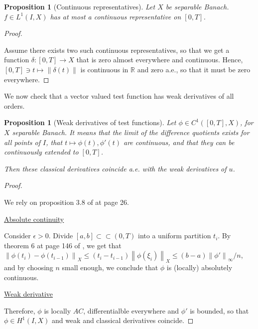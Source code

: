 \documentclass[english,a4paper,12pt,oneside]{scrbook}
\theoremstyle{break}
\newtheorem{prop}[equation]{Proposition}
\newenvironment{mproof}[1][\proofname]{%
  \begin{proof}[#1]$ $\par\nobreak\ignorespaces
}{%
  \end{proof}
}
\renewcommand*{\proofname}{Proof}
\theoremstyle{remark}
\newcommand{\mR}{\mathbb{R}}
\newcommand{\ds}{\displaystyle}
\newcommand{\norm}[1]{\left\lVert#1\right\rVert}
\newcommand{\cc}{\subset\subset}
\newcommand{\emb}{\hookrightarrow}
\begin{document}
\begin{prop}[Continuous representatives]
\label{prop:cts_repr}
Let $X$ be separable Banach. $f \in L^1(I,X)$ has at most a continuous representative on $[0,T]$.
\end{prop}
\begin{mproof}
Assume there exists two such continuous representatives, so that we get a function $\delta: [0,T] \rightarrow X$ that is zero almost everywhere and continuous. Hence, $[0,T] \ni t \mapsto \norm{\delta(t)}$ is continuous in $\mR$ and zero a.e., so that it must be zero everywhere.
\end{mproof}

%
%
%

We now check that a vector valued test function has weak derivatives of all orders.

\begin{prop}[Weak derivatives of test functions]
\label{prop:weak_class}
Let $\phi \in C^1([0,T],X)$, for $X$ separable Banach. It means that the limit of the difference quotients exists for all points of $I$, that $t\mapsto \phi(t), \phi'(t)$ are continuous, and that they can be continuously extended to $[0,T]$.

Then these classical derivatives coincide a.e. with the weak derivatives of $u$.

\end{prop}
\begin{mproof}


We rely on proposition 3.8 of \cite{kreuter} at page 26.

\underline{Absolute continuity}

Consider $\epsilon >0$. Divide $[a,b] \cc (0,T)$ into a uniform partition $t_i$. By theorem 6 at page 146 of \cite{mvt}, we get that $\ds \norm{\phi(t_i)-\phi(t_{i-1})}_X \leq (t_i-t_{i-1})\norm{\phi(\xi_i)}_X\leq (b-a) \norm{\phi'}_{\infty}/n$, and by choosing $n$ small enough, we conclude that $\phi$ is (locally) absolutely continuous.

\underline{Weak derivative}

Therefore, $\phi$ is locally $AC$, differentialble everywhere and $\phi'$ is bounded, so that $\phi \in H^1(I,X)$ and weak and classical derivatives coincide. 

\end{mproof}
\end{document}
